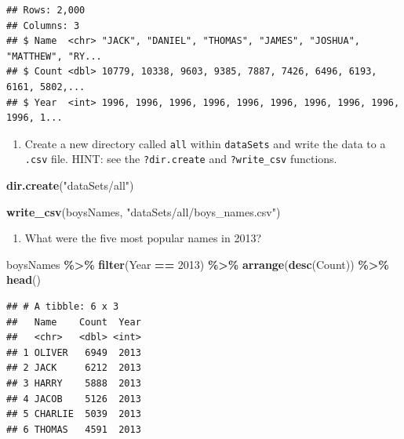 \documentclass[
]{book}
\newenvironment{Shaded}{\begin{snugshade}}{\end{snugshade}}
\newcommand{\DecValTok}[1]{\textcolor[rgb]{0.00,0.00,0.81}{#1}}
\newcommand{\KeywordTok}[1]{\textcolor[rgb]{0.13,0.29,0.53}{\textbf{#1}}}
\newcommand{\NormalTok}[1]{#1}
\newcommand{\OperatorTok}[1]{\textcolor[rgb]{0.81,0.36,0.00}{\textbf{#1}}}
\newcommand{\StringTok}[1]{\textcolor[rgb]{0.31,0.60,0.02}{#1}}
\providecommand{\tightlist}{%
  \setlength{\itemsep}{0pt}\setlength{\parskip}{0pt}}
\begin{document}
\begin{verbatim}
## Rows: 2,000
## Columns: 3
## $ Name  <chr> "JACK", "DANIEL", "THOMAS", "JAMES", "JOSHUA", "MATTHEW", "RY...
## $ Count <dbl> 10779, 10338, 9603, 9385, 7887, 7426, 6496, 6193, 6161, 5802,...
## $ Year  <int> 1996, 1996, 1996, 1996, 1996, 1996, 1996, 1996, 1996, 1996, 1...
\end{verbatim}

\begin{enumerate}
\def\labelenumi{\arabic{enumi}.}
\setcounter{enumi}{1}
\tightlist
\item
  Create a new directory called \texttt{all} within \texttt{dataSets} and write the data to a \texttt{.csv} file. HINT: see the \texttt{?dir.create} and \texttt{?write\_csv} functions.
\end{enumerate}

\begin{Shaded}
\begin{Highlighting}[]
\KeywordTok{dir.create}\NormalTok{(}\StringTok{"dataSets/all"}\NormalTok{)}

\KeywordTok{write\_csv}\NormalTok{(boysNames, }\StringTok{"dataSets/all/boys\_names.csv"}\NormalTok{)}
\end{Highlighting}
\end{Shaded}

\begin{enumerate}
\def\labelenumi{\arabic{enumi}.}
\setcounter{enumi}{2}
\tightlist
\item
  What were the five most popular names in 2013?
\end{enumerate}

\begin{Shaded}
\begin{Highlighting}[]
\NormalTok{boysNames }\OperatorTok{\%\textgreater{}\%}\StringTok{ }
\StringTok{  }\KeywordTok{filter}\NormalTok{(Year }\OperatorTok{==}\StringTok{ }\DecValTok{2013}\NormalTok{) }\OperatorTok{\%\textgreater{}\%}
\StringTok{  }\KeywordTok{arrange}\NormalTok{(}\KeywordTok{desc}\NormalTok{(Count)) }\OperatorTok{\%\textgreater{}\%}
\StringTok{  }\KeywordTok{head}\NormalTok{()}
\end{Highlighting}
\end{Shaded}

\begin{verbatim}
## # A tibble: 6 x 3
##   Name    Count  Year
##   <chr>   <dbl> <int>
## 1 OLIVER   6949  2013
## 2 JACK     6212  2013
## 3 HARRY    5888  2013
## 4 JACOB    5126  2013
## 5 CHARLIE  5039  2013
## 6 THOMAS   4591  2013
\end{verbatim}
\end{document}
